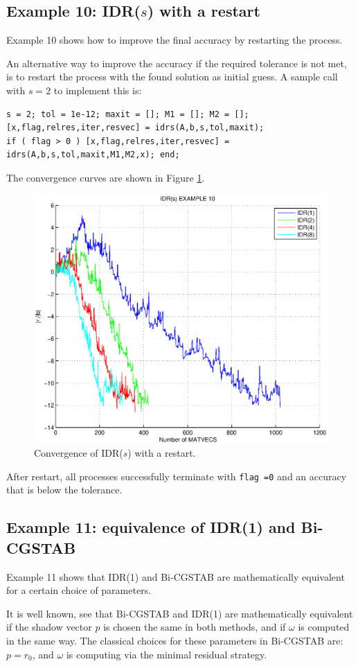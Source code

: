 \documentclass[prodmode,acmtoms]{acmsmall}
\begin{document}
\subsection{Example 10: IDR($s$) with a restart}
Example 10 shows how to improve the final accuracy by restarting the process. 

An alternative way to improve the accuracy if the required tolerance is not met, is to restart the process with
the found solution as initial guess. A sample call with $s= 2$ to implement this is:
\begin{verbatim}
s = 2; tol = 1e-12; maxit = []; M1 = []; M2 = [];
[x,flag,relres,iter,resvec] = idrs(A,b,s,tol,maxit);
if ( flag > 0 ) [x,flag,relres,iter,resvec] = idrs(A,b,s,tol,maxit,M1,M2,x); end;
\end{verbatim}

The convergence curves are shown in Figure \ref{fig:example10}.
\begin{figure}
\centering
\includegraphics[width=.60\linewidth]{example10}
\caption{Convergence of IDR($s$) with a restart.}
\label{fig:example10}
\end{figure}
After restart, all processes successfully terminate with {\tt flag =0} and an accuracy that is below the tolerance.

\subsection{Example 11: equivalence of IDR(1) and Bi-CGSTAB}
Example 11 shows that IDR(1) and Bi-CGSTAB are mathematically equivalent for a certain choice of parameters.

It is well known, see \cite{idrs} that Bi-CGSTAB and IDR(1) are mathematically equivalent if the shadow vector 
$p$ is chosen the same in both methods, and if $\omega$ is
computed in the same way. The classical choices for these parameters in Bi-CGSTAB are: $p = r_0$, and $\omega$ is
computing via the minimal residual strategy.
\end{document}
